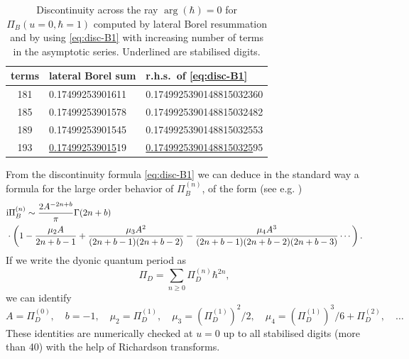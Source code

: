\documentclass[a4paper,11pt]{article}
\theoremstyle{definition}
\newcommand{\ri}{{\rm i}}
\def\({\left(}
\def\){\right)}
\newcommand{\nn}{\nonumber \\}
\begin{document}
\begin{table}
  \centering
  \begin{tabular}{cll}\toprule
    terms & lateral Borel sum & r.h.s.\ of \eqref{eq:disc-B1}\\\midrule
    181   & 0.17499253901611 & 0.1749925390148815032360 \\
    185   & 0.17499253901578 & 0.1749925390148815032482 \\
    189   & 0.17499253901545 & 0.1749925390148815032553 \\
    193   & \underline{0.174992539015}19
                              & \underline{0.17499253901488150325}95 \\\bottomrule
  \end{tabular}
  \caption{Discontinuity across the ray $\arg(\hbar) = 0$
    for $\Pi_B(u=0,\hbar=1)$ computed by lateral Borel resummation and
    by using \eqref{eq:disc-B1} with increasing number of terms in the
    asymptotic series. Underlined are stabilised digits.}
  \label{tb:disc-Bu0}
\end{table}

From the discontinuity formula \eqref{eq:disc-B1} we can deduce in the
standard way a formula for the large order behavior of $\Pi_B^{(n)}$,
of the form (see e.g. \cite{msw})
%
\begin{align}
&  \ri \Pi_B^{(n)}  \sim
  \frac{2 A^{-2n+b}}{\pi} \Gamma(2n+b) \nn
  &\cdot\(
    1-\frac{\mu_2 A}{2n+b-1}+ \frac{\mu_3
    A^2}{(2n+b-1)(2n+b-2)} - \frac{\mu_4
    A^3}{(2n+b-1)(2n+b-2)(2n+b-3)}\cdots\). \label{eq:aD-asymp}
\end{align}
%
If we write the dyonic quantum period as
%
\begin{equation}
  \Pi_D= \sum_{n \ge 0} \Pi_D^{(n)}\hbar^{2n},
\end{equation}
%
we can identify
%
\begin{equation}
  A= \Pi_D^{(0)}, \quad b=-1,\quad \mu_2= \Pi_D^{(1)}, \quad \mu_3 =
  (\Pi_D^{(1)})^2/2 
  ,\quad \mu_4 = (\Pi_D^{(1)})^3/6+\Pi_D^{(2)}  ,\quad\ldots
\end{equation}
%
These identities are numerically checked at $u=0$ up to
all stabilised digits (more than 40) with the help of Richardson
transforms.
\end{document}
